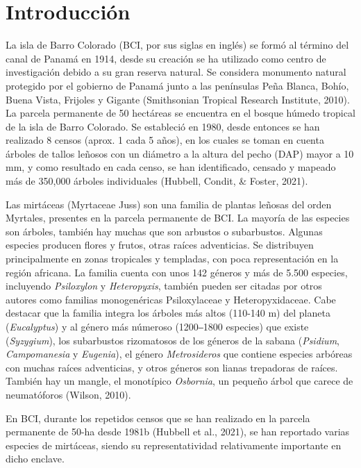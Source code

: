 \documentclass[11pt,]{article}
\begin{document}
\vskip 6.5pt


\noindent  \section{Introducción}\label{introducciuxf3n}

La isla de Barro Colorado (BCI, por sus siglas en inglés) se formó al
término del canal de Panamá en 1914, desde su creación se ha utilizado
como centro de investigación debido a su gran reserva natural. Se
considera monumento natural protegido por el gobierno de Panamá junto a
las penínsulas Peña Blanca, Bohío, Buena Vista, Frijoles y Gigante
(Smithsonian Tropical Research Institute, 2010). La parcela permanente
de 50 hectáreas se encuentra en el bosque húmedo tropical de la isla de
Barro Colorado. Se estableció en 1980, desde entonces se han realizado 8
censos (aprox. 1 cada 5 años), en los cuales se toman en cuenta árboles
de tallos leñosos con un diámetro a la altura del pecho (DAP) mayor a 10
mm, y como resultado en cada censo, se han identificado, censado y
mapeado más de 350,000 árboles individuales (Hubbell, Condit, \& Foster,
2021).

Las mirtáceas (Myrtaceae Juss) son una familia de plantas leñosas del
orden Myrtales, presentes en la parcela permanente de BCI. La mayoría de
las especies son árboles, también hay muchas que son arbustos o
subarbustos. Algunas especies producen flores y frutos, otras raíces
adventicias. Se distribuyen principalmente en zonas tropicales y
templadas, con poca representación en la región africana. La familia
cuenta con unos 142 géneros y más de 5.500 especies, incluyendo
\emph{Psiloxylon} y \emph{Heteropyxis}, también pueden ser citadas por
otros autores como familias monogenéricas Psiloxylaceae y
Heteropyxidaceae. Cabe destacar que la familia integra los árboles más
altos (110-140 m) del planeta (\emph{Eucalyptus}) y al género más
númeroso (1200‒1800 especies) que existe (\emph{Syzygium}), los
subarbustos rizomatosos de los géneros de la sabana (\emph{Psidium},
\emph{Campomanesia} y \emph{Eugenia}), el género \emph{Metrosideros} que
contiene especies arbóreas con muchas raíces adventicias, y otros
géneros son lianas trepadoras de raíces. También hay un mangle, el
monotípico \emph{Osbornia}, un pequeño árbol que carece de neumatóforos
(Wilson, 2010).

En BCI, durante los repetidos censos que se han realizado en la parcela
permanente de 50-ha desde 1981b (Hubbell et al., 2021), se han reportado
varias especies de mirtáceas, siendo su representatividad relativamente
importante en dicho enclave.
\end{document}
